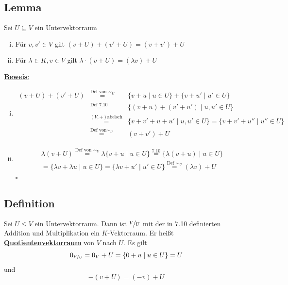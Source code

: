 \subsection{Lemma} %
\label{sub:lemma}
Sei $U \subseteq  V$ ein Untervektorraum
\begin{enumerate}[(i)]
	\item Für $v,v' \in V$ gilt $(v+U)+(v'+U)=(v+v') +U$
	\item Für $\lambda \in K , v \in V$ gilt $\lambda  \cdot (v+U)= (\lambda v) +U$
\end{enumerate}
\underline{\textbf{Beweis}:} \\
\begin{enumerate}[(i)]
	\item 
	\[
	\begin{array}{rcl}
		(v+U)+(v' +U) & \overset{\text{Def von $\sim_U$}}{=}  & \{ v+u \mid u \in U \}+\{ v+u' \mid u' \in U\}  \\
		 & \overset{\text{Def 7.10}}{=} & \{  (v+u) + (v'+u') \mid u,u'  \in U \} \\
		 & \overset{(V,+) \text{abelsch}}{=} & \{ v+v' + u+u' \mid u,u' \in U \} = \{  v+v' + u'' \mid u'' \in U\} \\
		 & \overset{\text{Def von} \sim_U}{=} & (v+v')+U
	\end{array}
	\]
	\item \begin{gather*}
		\lambda  (v+U) \overset{\text{Def von }\sim_U}{=} \lambda \{ v+u \mid u\in U \} \overset{7.10}{=} \{ \lambda (v+u) \mid u \in U \} \\
		= \{ \lambda v + \lambda u \mid u \in U \} = \{ \lambda v + u' \mid u'  \in U \} \overset{\text{Def }\sim_U}{=} (\lambda v)+U
	\end{gather*}
	\hfill \( \square \)
\end{enumerate}

\subsection{Definition} %
\label{sub:definition}
Sei $U \le V$ ein Untervektorraum. Dann ist $\nicefrac{V}{U}$ mit der in 7.10 definierten Addition und Multiplikation ein $K$-Vektorraum. 
Er heißt \underline{\textbf{Quotientenvektorraum}} von $V$ nach $U$. Es gilt
\[
	0_{\nicefrac{V}{U}} = 0_V +U = \{ 0 +u \mid u \in U \} = U
\]
und
\[
	-(v+U) = (-v)+U
\]

\setcounter{subsection}{11}
